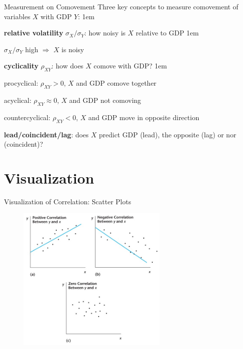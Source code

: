 \documentclass[11pt,aspectratio=43]{beamer}
\let\olditemize=\itemize
\let\endolditemize=\enditemize
\renewenvironment{itemize}{\olditemize \itemsep1em}{\endolditemize}
\let\oldenumerate=\enumerate
\let\endoldenumerate=\endenumerate
\renewenvironment{enumerate}{\oldenumerate \itemsep1em}{ \endoldenumerate}
\theoremstyle{definition}
\begin{document}
\begin{frame}{Measurement on Comovement}
\label{slide:Measurement_on_Comovement}
    Three key concepts to measure comovement of variables $ X $ with GDP $ Y $:
    \begin{enumerate}
        \item \textbf{relative volatility} $ \sigma_{X} / \sigma_{Y} $: how noisy is $ X $ relative to GDP
        \begin{itemize}
            \item $ \sigma_{X} / \sigma_{Y} $ high $ \Rightarrow  $ $ X $ is noisy
        \end{itemize}
        \item \textbf{cyclicality} $ \rho_{XY} $: how does $ X $ comove with GDP?
        \begin{enumerate}
            \item \alert{procyclical}: $ \rho_{XY} > 0 $, $ X $ and GDP comove \alert{together}
            \item \alert{acyclical}: $ \rho_{XY} \approx 0 $, $ X $ and GDP not comoving
            \item \alert{countercyclical}: $ \rho_{XY} < 0 $, $ X $ and GDP move in \alert{opposite} direction
        \end{enumerate}
        \item \textbf{lead/coincident/lag}: does $ X $ predict GDP (lead), the opposite (lag) or nor (coincident)?
    \end{enumerate}
\end{frame}

\section{Visualization}
\label{sec:Visualization}

\begin{frame}{Visualization of Correlation: Scatter Plots}
\label{slide:Visualization_of_Correlation__Scatter_Plots}
    \begin{figure}
        \includegraphics[width=0.65\textwidth]{./figures/Figure3_4.jpg}
    \end{figure}
\end{frame}
\end{document}
